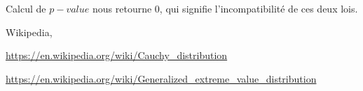 \documentclass[12pt,a4paper,titlepage]{article}
\numberwithin{equation}{section}
\begin{document}
Calcul de $p-value$ nous retourne $0$, qui signifie l'incompatibilité de ces deux lois.
\clearpage

\begin{thebibliography}{3}

Wikipedia,

\url{https://en.wikipedia.org/wiki/Cauchy_distribution}

\url{https://en.wikipedia.org/wiki/Generalized_extreme_value_distribution}

\end{thebibliography}
\end{document}
